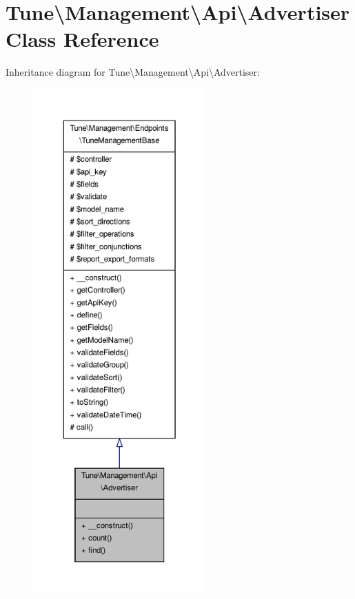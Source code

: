 \hypertarget{classTune_1_1Management_1_1Api_1_1Advertiser}{\section{Tune\textbackslash{}Management\textbackslash{}Api\textbackslash{}Advertiser Class Reference}
\label{classTune_1_1Management_1_1Api_1_1Advertiser}
}


Inheritance diagram for Tune\textbackslash{}Management\textbackslash{}Api\textbackslash{}Advertiser\-:
\nopagebreak
\begin{figure}[H]
\begin{center}
\leavevmode
\includegraphics[height=550pt]{classTune_1_1Management_1_1Api_1_1Advertiser__inherit__graph}
\end{center}
\end{figure}


